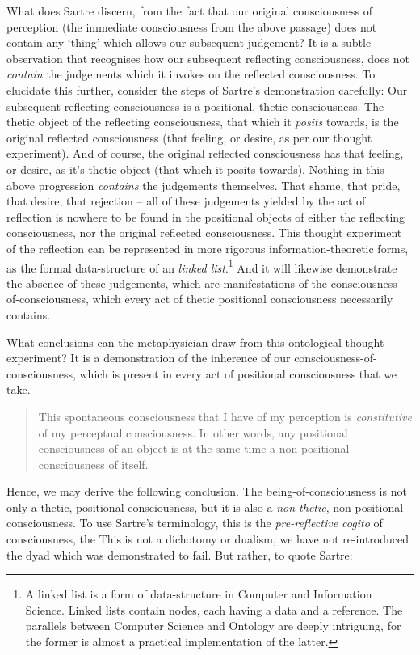 \noindent
What does Sartre discern, from the fact that our original consciousness of perception (the immediate consciousness from the above passage) does not contain any \enquote*{thing} which allows our subsequent judgement? It is a subtle observation that recognises how our subsequent reflecting consciousness, does not \emph{contain} the judgements which it invokes on the reflected consciousness. To elucidate this further, consider the steps of Sartre's demonstration carefully: Our subsequent reflecting consciousness is a positional, thetic consciousness. The thetic object of the reflecting consciousness, that which it \emph{posits} towards, is the original reflected consciousness (that feeling, or desire, as per our thought experiment). And of course, the original reflected consciousness has that feeling, or desire, as it's thetic object (that which it posits towards). Nothing in this above progression \emph{contains} the judgements themselves. That shame, that pride, that desire, that rejection -- all of these judgements yielded by the act of reflection is nowhere to be found in the positional objects of either the reflecting consciousness, nor the original reflected consciousness. This thought experiment of the reflection can be represented in more rigorous information-theoretic forms, as the formal data-structure of an \emph{linked list}.\footnote{A linked list is a form of data-structure in Computer and Information Science. Linked lists contain nodes, each having a data and a reference. The parallels between Computer Science and Ontology are deeply intriguing, for the former is almost a practical implementation of the latter.} And it will likewise demonstrate the absence of these judgements, which are manifestations of the consciousness-of-consciousness, which every act of thetic positional consciousness necessarily contains.

What conclusions can the metaphysician draw from this ontological thought experiment? It is a demonstration of the inherence of our consciousness-of-consciousness, which is present in every act of positional consciousness that we take. 
\blockcquote[11]{Sartre}{This spontaneous consciousness that I have of my perception is \emph{constitutive} of my perceptual consciousness. In other words, any positional consciousness of an object is at the same time a non-positional consciousness of itself.} Hence, we may derive the following conclusion. The being-of-consciousness is not only a thetic, positional consciousness, but it is also a \emph{non-thetic}, non-positional consciousness. To use Sartre's terminology, this is the \emph{pre-reflective cogito} of consciousness, the  This is not a dichotomy or dualism, we have not re-introduced the dyad which was demonstrated to fail. But rather, to quote Sartre:

